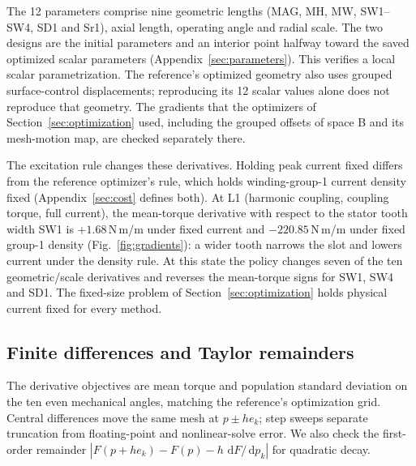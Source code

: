 \documentclass{anvil-paper}
\newcommand{\dd}{\,\mathrm{d}}
\begin{document}
The 12 parameters comprise nine geometric lengths (MAG, MH, MW,
SW1--SW4, SD1 and Sr1), axial length, operating angle and radial scale.
The two designs are the initial parameters and an interior point halfway
toward the saved optimized scalar parameters
(Appendix~\ref{sec:parameters}). This verifies a local scalar
parametrization. The reference's optimized geometry also uses grouped
surface-control displacements; reproducing its 12 scalar values alone
does not reproduce that geometry. The gradients that the optimizers of
Section~\ref{sec:optimization} used, including the grouped offsets of space B
and its mesh-motion map, are checked separately there.

The excitation rule changes these derivatives. Holding peak current fixed
differs from the reference optimizer's rule, which holds winding-group-1
current density fixed (Appendix~\ref{sec:cost} defines both). At L1
(harmonic coupling, coupling torque, full current), the mean-torque
derivative with respect to the stator tooth width SW1 is $+1.68$\,N\,m/m
under fixed current and $-220.85$\,N\,m/m under fixed group-1 density
(Fig.~\ref{fig:gradients}): a wider tooth narrows the slot and lowers
current under the density rule. At this state the policy changes seven of
the ten geometric/scale derivatives and reverses the mean-torque signs for
SW1, SW4 and SD1. The fixed-size problem of Section~\ref{sec:optimization}
holds physical current fixed for every method.

\subsection{Finite differences and Taylor remainders}
The derivative objectives are mean torque and population standard
deviation on the ten even mechanical angles, matching the reference's
optimization grid. Central differences move the same mesh at $p\pm h e_k$;
step sweeps separate truncation from floating-point and nonlinear-solve
error. We also check the first-order remainder
$|F(p+h e_k)-F(p)-h\,\dd F/\dd p_k|$ for quadratic decay.
\end{document}
